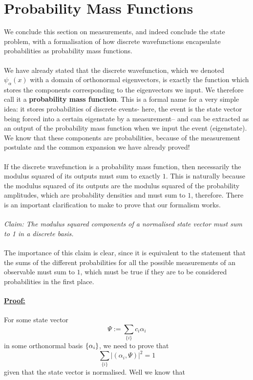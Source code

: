 \section{Probability Mass Functions}
We conclude this section on measurements, and indeed conclude the state problem, with a formalisation of how discrete wavefunctions encapsulate probabilities as probability mass functions.
\\\\
We have already stated that the discrete wavefunction, which we denoted ${\psi}_{\alpha}(x)$ with a domain of orthonormal eigenvectors, is exactly the function which stores the components corresponding to the eigenvectors we input. We therefore call it a \textbf{probability mass function}. This is a formal name for a very simple idea: it stores probabilities of discrete events- here, the event is the state vector being forced into a certain eigenstate by a measurement-- and can be extracted as an output of the probability mass function when we input the event (eigenstate). We know that these components are probabilities, because of the measurement postulate and the common expansion we have already proved! 
\\\\
If the discrete wavefunction is a probability mass function, then necessarily the modulus squared of its outputs must sum to exactly $1$. This is naturally because the modulus squared of its outputs are the modulus squared of the probability amplitudes, which are probability densities and must sum to $1$, therefore. There is an important clarification to make to prove that our formalism works.
\\\\
\textit{Claim: The modulus squared components of a normalised state vector must sum to 1 in a discrete basis.}
\\\\
The importance of this claim is clear, since it is equivalent to the statement that the sums of the different probabilities for all the possible measurements of an observable must sum to $1$, which must be true if they are to be considered probabilities in the first place.
\\\\
\textbf{\underline{Proof:}}
\\\\
For some state vector
$$
\Psi:=\sum_{\{i\}}c_{i}\alpha_{i}
$$ 
in some orthonormal basis $\{\alpha_{i}\}$, we need to prove that 
$$
\sum_{\{i\}}|(\alpha_{i},\Psi)|^2=1
$$
given that the state vector is normalised. Well we know that 
